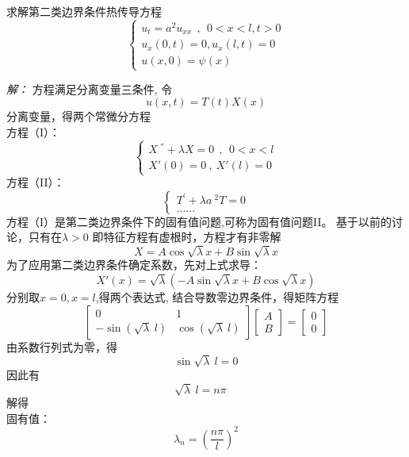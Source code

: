 \begin{example}
	求解第二类边界条件热传导方程
	$$
	\begin{cases}
		u_{t} =a^2u_{xx} ~~,~~ 0<x<l, t>0\\
		u_x (0,t) =0, u_x (l,t)=0 \\
		u(x,0) =\psi(x)
	\end{cases}
	$$ 
\end{example}
\emph{解：}
	方程满足分离变量三条件, 令 $$\displaystyle  u(x,t)=T(t)X(x) $$
分离变量，得两个常微分方程 \\
方程（I）：\\
$$\displaystyle  \begin{cases}
	X~^{''} +\lambda X=0  ~~,~~ 0<x<l\\
	X'(0)=0 ~,~X' (l)=0
\end{cases}$$ 	
方程（II）：\\
$$\displaystyle  \begin{cases}
	T^{'} +\lambda {a~^2 T}=0 \\
	......
\end{cases}$$ 	
方程（I）是第二类边界条件下的固有值问题,可称为固有值问题II。
基于以前的讨论，只有在$\lambda >0 $ 即特征方程有虚根时，方程才有非零解\\
	\begin{equation} \label{eq:two}
		X=A\cos \sqrt{\lambda} x + B \sin \sqrt{\lambda} x
	\end{equation}
为了应用第二类边界条件确定系数，先对上式求导：
	\begin{equation*}
		X' (x)=\sqrt{\lambda} (-A\sin \sqrt{\lambda} x + B \cos \sqrt{\lambda} x)
	\end{equation*}
分别取$x=0, x=l$,得两个表达式, 结合导数零边界条件，得矩阵方程 
$$\left[
	\begin{array}{lll}
		0&1\\
		-\sin( {\sqrt{\lambda}~l}) &\cos ({\sqrt{\lambda}~l})
	\end{array}
	\right]
	\left[
	\begin{array}{ll}
		A\\
		B
	\end{array}
	\right]
	=\left[
	\begin{array}{ll}
		0\\
		0
	\end{array}
	\right]$$
	由系数行列式为零，得$$ \sin\sqrt{\lambda}~l =0$$
	因此有
	$$\sqrt{\lambda}~l = n\pi \quad $$ 
	解得\\
	固有值：
	\begin{equation*}
		\lambda_n =(\frac{n\pi}{l})^2 
	\end{equation*}

